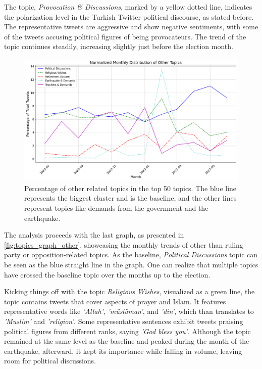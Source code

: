 The topic, \textit{Provocation \& Discussions}, marked by a yellow dotted line, indicates the polarization 
level in the Turkish Twitter political discourse, as stated before. The representative tweets are aggressive 
and show negative sentiments, with some of the tweets accusing political figures of being provocateurs. 
The trend of the topic continues steadily, increasing slightly just before the election month.

\begin{figure}[htb]
    \centering
    \includegraphics[width=\linewidth]{figures/normalized_other_selected_topics_distribution_with_styles.png}
    \caption[Normalized monthly distribution of other related topics]
    {Percentage of other related topics in the top 50 topics. 
    The blue line represents the biggest cluster and is the baseline, 
    and the other lines represent topics like demands from the government and the earthquake.}\label{fig:topics_graph_other}
\end{figure}

The analysis proceeds with the last graph, as presented in \autoref{fig:topics_graph_other}, showcasing the 
monthly trends of other than ruling party or opposition-related topics. As the baseline, 
\textit{Political Discussions} topic can be seen as the blue straight line in the graph. 
One can realize that multiple topics have crossed the baseline topic over the months up to the election. 

Kicking things off with the topic \textit{Religious Wishes}, visualized as a green line, the topic contains 
tweets that cover aspects of prayer and Islam. It features representative words like \textit{'Allah'}, 
\textit{'müslüman'}, and \textit{'din'}, which than translates to \textit{'Muslim'} and \textit{'religion'}. 
Some representative sentences exhibit tweets praising political figures from different ranks, 
saying \textit{'God bless you'}. 
Although the topic remained at the same level as the baseline and peaked during the month of the earthquake, 
afterward, it kept its importance while falling in volume, leaving room for political discussions.

